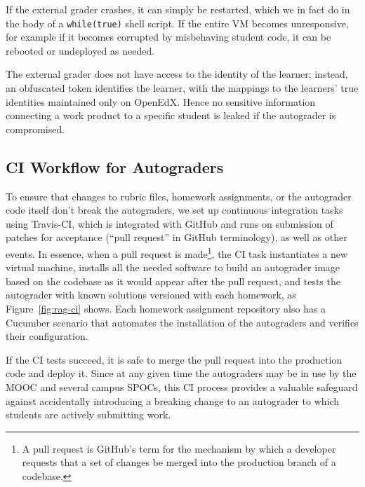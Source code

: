 If the external grader crashes, it can simply be restarted, which we in
fact do in the body of a \texttt{while(true)} shell script.  If the
entire VM becomes unresponsive, for example if it becomes corrupted by
misbehaving student code, it can be rebooted or undeployed as
needed. 

The external grader does not have access to the identity of the learner;
instead, an obfuscated token identifies the learner, with the mappings
to the learners' true identities maintained only on OpenEdX.
Hence no sensitive information connecting a work product to a specific
student is leaked if the autograder is compromised.


\subsection{CI Workflow for Autograders}

To ensure that changes to rubric files, homework assignments, or the
autograder code itself don't break the autograders, 
we set up continuous integration tasks using Travis-CI, which is integrated with
GitHub and runs on submission of patches for acceptance (``pull request''
in GitHub terminology), as well as other events. 
In essence, when a pull request is made\footnote{A pull request is
  GitHub's term for the mechanism by which a developer requests that a
  set of changes 
  be merged into the production branch of a codebase.},  
the CI task instantiates  a
new virtual 
machine, installs all the needed software to build an autograder image
based on the codebase as it would appear after the pull request,
and tests the autograder with known solutions versioned with each homework, as
Figure~\ref{fig:rag-ci} shows.
Each homework assignment repository also has a Cucumber scenario that
automates the installation of the autograders and verifies their
configuration. 

If the CI tests succeed, it is safe to merge the pull request into the
production code and deploy it.  Since at any given time the autograders
may be in use by the MOOC and several campus SPOCs,
this CI process provides a valuable safeguard
against accidentally introducing a breaking change to an autograder to
which students are actively submitting work.

